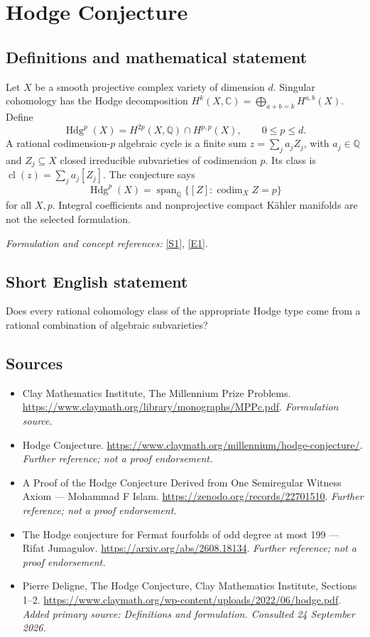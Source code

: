 \documentclass[11pt]{article}
\begin{document}
\section*{\texorpdfstring{Hodge Conjecture}{Hodge Conjecture}}\label{6}
\subsection{Definitions and mathematical statement}
Let $X$ be a smooth projective complex variety of dimension $d$. Singular cohomology has the Hodge decomposition $H^k(X,{\mathbb{C}})=\bigoplus_{a+b=k}H^{a,b}(X)$. Define
\[
 \operatorname{Hdg}^{p}(X)=H^{2p}(X,{\mathbb{Q}})\cap H^{p,p}(X),\qquad 0\le p\le d.
\]
A rational codimension-$p$ algebraic cycle is a finite sum $z=\sum_j a_j Z_j$, with $a_j\in{\mathbb{Q}}$ and $Z_j\subseteq X$ closed irreducible subvarieties of codimension $p$. Its class is $\operatorname{cl}(z)=\sum_j a_j[Z_j]$. The conjecture says
\[
 \operatorname{Hdg}^{p}(X)=\operatorname{span}_{{\mathbb{Q}}}\{[Z]:\operatorname{codim}_X Z=p\}
\]
for all $X,p$. Integral coefficients and nonprojective compact Kähler manifolds are not the selected formulation.
\par\smallskip\textit{Formulation and concept references:} \href{https://www.claymath.org/library/monographs/MPPc.pdf}{[S1]}, \href{https://www.claymath.org/wp-content/uploads/2022/06/hodge.pdf}{[E1]}.

\subsection{Short English statement}
Does every rational cohomology class of the appropriate Hodge type come from a rational combination of algebraic subvarieties?
\subsection{Sources}
\begin{itemize}
\item[S1]Clay Mathematics Institute, The Millennium Prize Problems.
\url{https://www.claymath.org/library/monographs/MPPc.pdf}.
\textit{Formulation source.}
\item[S2]Hodge Conjecture.
\url{https://www.claymath.org/millennium/hodge-conjecture/}.
\textit{Further reference; not a proof endorsement.}
\item[S3]A Proof of the Hodge Conjecture Derived from One Semiregular Witness Axiom — Mohammad F Islam.
\url{https://zenodo.org/records/22701510}.
\textit{Further reference; not a proof endorsement.}
\item[S4]The Hodge conjecture for Fermat fourfolds of odd degree at most 199 — Rifat Jumagulov.
\url{https://arxiv.org/abs/2608.18134}.
\textit{Further reference; not a proof endorsement.}
\item[E1]Pierre Deligne, The Hodge Conjecture, Clay Mathematics Institute, Sections 1--2.
\url{https://www.claymath.org/wp-content/uploads/2022/06/hodge.pdf}.
\textit{Added primary source: Definitions and formulation. Consulted 24 September 2026.}
\end{itemize}
\end{document}
